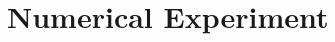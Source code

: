 \documentclass[preprint,12pt]{elsarticle}
\begin{document}
\section{Numerical Experiment}














\end{document}
